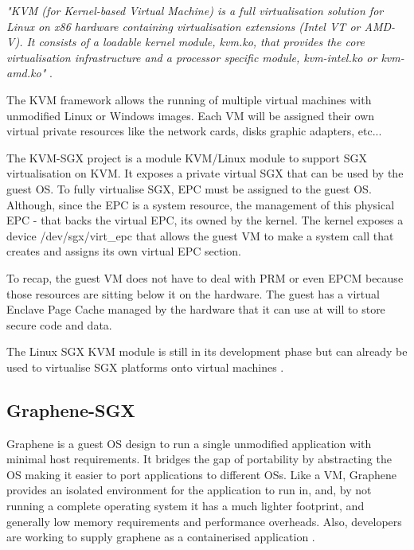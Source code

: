 \textit{"\gls{KVM} (for Kernel-based Virtual Machine) is a full virtualisation solution for Linux on x86 hardware containing virtualisation extensions (Intel VT or AMD-V). It consists of a loadable kernel module, kvm.ko, that provides the core virtualisation infrastructure and a processor specific module, kvm-intel.ko or kvm-amd.ko"} \cite{kvm:1}.

The \gls{KVM} framework allows the running of multiple virtual machines with unmodified Linux or Windows images. Each \gls{VM} will be assigned their own virtual private resources like the network cards, disks graphic adapters, etc...

The KVM-SGX project is a module KVM/Linux module to support SGX virtualisation on \gls{KVM}. It exposes a private virtual SGX that can be used by the guest \gls{OS}.
To fully virtualise \gls{SGX}, \gls{EPC} must be assigned to the guest \gls{OS}. Although, since the \gls{EPC} is a system resource, the management of this physical \gls{EPC} - that backs the virtual \gls{EPC}, its owned by the kernel. The kernel exposes a device /dev/sgx/virt\_epc that allows the guest \gls{VM} to make a system call that creates and assigns its own virtual \gls{EPC} section.

To recap, the guest \gls{VM} does not have to deal with \gls{PRM} or even \gls{EPCM} because those resources are sitting below it on the hardware. The guest has a virtual Enclave Page Cache managed by the hardware that it can use at will to store secure code and data.

The Linux \gls{SGX} \gls{KVM} module is still in its development phase but can already be used to virtualise \gls{SGX} platforms onto virtual machines \cite{kvm-sgx:1, kvm-sgx:2, kvm-sgx:3}.

\subsection{Graphene-SGX}
\label{ssec:graphene-sgx}

Graphene \cite{graphene:1, graphene:2, graphene:4} is a guest OS design to run a single unmodified application with minimal host requirements. It bridges the gap of portability by abstracting the \gls{OS} making it easier to port applications to different \glspl{OS}. Like a \gls{VM}, Graphene provides an isolated environment for the application to run in, and, by not running a complete operating system it has a much lighter footprint, and generally low memory requirements and performance overheads. Also, developers are working to supply graphene as a containerised application \cite{graphene_container:1}. 

